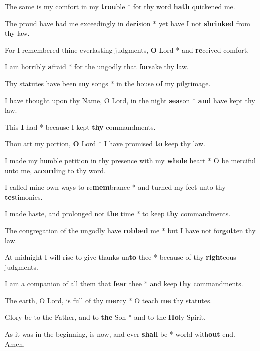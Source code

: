 \begin{multicols}{2}
	The same is my comfort in my \textbf{trou}ble * for thy word \textbf{hath} quickened me.

	The proud have had me exceedingly in de\textbf{ri}sion * yet have I not \textbf{shrinked} from thy law.
	
	For I remembered thine everlasting judgments, \textbf{O} Lord * and \textbf{re}ceived comfort.
	
	I am horribly \textbf{a}fraid * for the ungodly that \textbf{for}sake thy law.
	
	Thy statutes have been \textbf{my} songs * in the house \textbf{of} my pilgrimage.
	
	I have thought upon thy Name, O Lord, in the night \textbf{sea}son * \textbf{and} have kept thy law.
	
	This \textbf{I} had * because I kept \textbf{thy} commandments.
	
	Thou art my portion, \textbf{O} Lord * I have promised \textbf{to} keep thy law.
	
	I made my humble petition in thy presence with my \textbf{whole} heart * O be merciful unto me, ac\textbf{cord}ing to thy word.
	
	I called mine own ways to re\textbf{mem}brance * and turned my feet unto thy \textbf{tes}timonies.
	
	I made haste, and prolonged not \textbf{the} time * to keep \textbf{thy} commandments.
	
	The congregation of the ungodly have \textbf{robbed} me * but I have not for\textbf{got}ten thy law.
	
	At midnight I will rise to give thanks un\textbf{to} thee * because of thy \textbf{right}eous judgments.
	
	I am a companion of all them that \textbf{fear} thee * and keep \textbf{thy} commandments.
	
	The earth, O Lord, is full of thy \textbf{mer}cy * O teach \textbf{me} thy statutes.
	
	Glory be to the Father, and to \textbf{the} Son * and to the \textbf{Ho}ly Spirit.
	
	As it was in the beginning, is now, and ever \textbf{shall} be * world with\textbf{out} end. Amen.
\end{multicols}